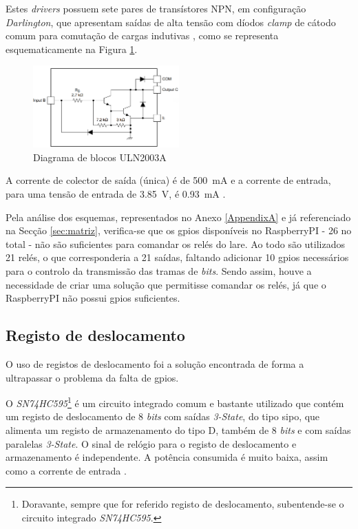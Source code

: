 Estes \textit{drivers} possuem sete pares de transístores NPN, em configuração \textit{Darlington}, que apresentam saídas de alta tensão com díodos \textit{clamp} de cátodo comum para comutação de cargas indutivas \cite{ULN2003}, como se  representa esquematicamente na Figura \ref{fig:2003blocos}.

\begin{figure}[hbtp]
    \centering
    \includegraphics[width=0.5\textwidth]{figures/2003A_Darling.png}
    \caption{Diagrama de blocos ULN2003A \cite{ULN2003}}
    \label{fig:2003blocos}
\end{figure}

A corrente de colector de saída (única) é de \SI{500}{\mA} e a corrente de entrada, para uma tensão de entrada de \SI{3.85}{\volt}, é \SI{0.93}{\mA} \cite{ULN2003}.

Pela análise dos esquemas, representados no Anexo \ref{AppendixA} e já referenciado na Secção \ref{sec:matriz}, verifica-se que os \acrshort{gpio}s disponíveis no \gls{RaspberryPI} - 26 no total - não são suficientes para comandar os relés do \acrshort{lare}. Ao todo são utilizados 21 relés, o que corresponderia a 21 saídas, faltando adicionar 10 \acrshort{gpio}s necessários para o controlo da transmissão das tramas de \textit{bits}. Sendo assim, houve a necessidade de criar uma solução que permitisse comandar os relés, já que o \gls{RaspberryPI} não possui \acrshort{gpio}s suficientes.

\subsection{Registo de deslocamento}
\label{sec:registodeslocamento}
O uso de registos de deslocamento foi a solução encontrada de forma a ultrapassar o problema da falta de \acrshort{gpio}s.

O \textit{SN74HC595}\footnote{Doravante, sempre que for referido registo de deslocamento, subentende-se o circuito integrado \textit{SN74HC595}.} é um circuito integrado comum e bastante utilizado que contém um registo de deslocamento de 8 \textit{bits} com saídas \textit{3-State}, do tipo \acrfull{sipo}, que alimenta um registo de armazenamento do tipo D, também de 8 \textit{bits} e com saídas paralelas \textit{3-State}. O sinal de relógio para o registo de deslocamento e armazenamento é independente. A potência consumida é muito baixa, assim como a corrente de entrada \cite{SN74HC595}.

